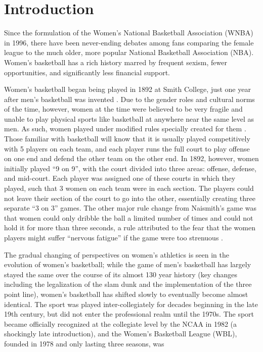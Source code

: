 \documentclass[12pt]{article}
\begin{document}
\section{Introduction}
Since the formulation of the Women’s National Basketball Association (WNBA) in 1996, there have been never-ending debates among fans comparing the female 
league to the much older, more popular National Basketball Association (NBA). Women’s basketball has a rich history marred by frequent sexism, fewer 
opportunities, and significantly less financial support.
\par
Women’s basketball began being played in 1892 at Smith College, just one year after men’s basketball was invented \citep{Shattering_The_Glass}. Due to the 
gender roles and cultural norms of the time, however, women at the time were believed to be very fragile and unable to play physical sports like 
basketball at anywhere near the same level as men. As such, women played under modified rules specially created for them \citep{WNBA_Hist}. Those familiar 
with basketball will know that it is usually played competitively with 5 players on each team, and each player runs the full court to play offense on one 
end and defend the other team on the other end. In 1892, however, women initially played “9 on 9”, with the court divided into three areas: offense, 
defense, and mid-court. Each player was assigned one of these courts in which they played, such that 3 women on each team were in each section. The 
players could not leave their section of the court to go into the other, essentially creating three separate “3 on 3” games. The other major rule change 
from Naismith's game was that women could only dribble the ball a limited number of times and could not hold it for more than three seconds, a rule 
attributed to the fear that the women players might suffer “nervous fatigue” if the game were too strenuous \citep{WNBA_Hist}.
\par
The gradual changing of perspectives on women’s athletics is seen in the evolution of women’s basketball; while the game of men’s basketball has largely 
stayed the same over the course of its almost 130 year history (key changes including the legalization of the slam dunk and the implementation of the 
three point line), women’s basketball has shifted slowly to eventually become almost identical. The sport was played inter-collegiately for decades 
beginning in the late 19th century, but did not enter the professional realm until the 1970s. The sport became officially recognized at the collegiate 
level by the NCAA in 1982 (a shockingly late introduction), and the Women’s Basketball League (WBL), founded in 1978 and only lasting three seasons, was 
\end{document}
